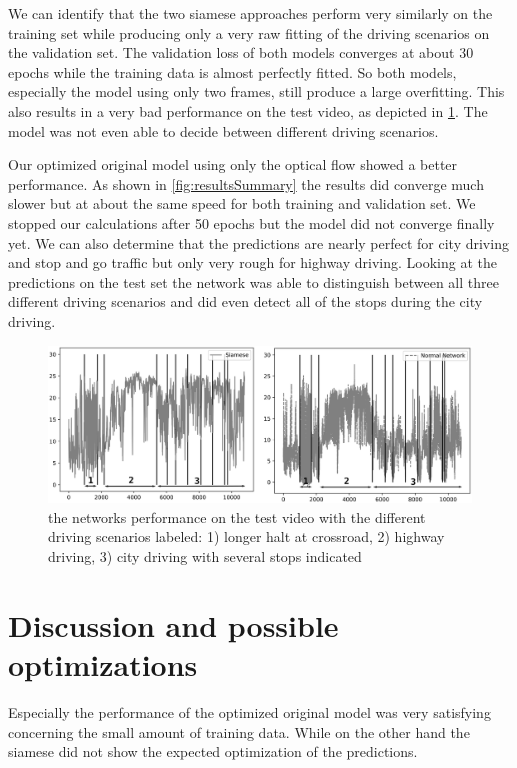 \documentclass[conference]{IEEEtran}
\begin{document}
We can identify that the two siamese approaches perform very similarly on the training set while producing only a very raw fitting of the driving scenarios on the validation set. The validation loss of both models converges at about 30 epochs while the training data is almost perfectly fitted. So both models, especially the model using only two frames, still produce a large overfitting. This also results in a very bad performance on the test video, as depicted in \cref{fig:resultsTestvideo}. The model was not even able to decide between different driving scenarios.

Our optimized original model using only the optical flow showed a better performance. As shown in \ref{fig:resultsSummary} the results did converge much slower but at about the same speed for both training and validation set. We stopped our calculations after 50 epochs but the model did not converge finally yet. We can also determine that the predictions are nearly perfect for city driving and stop and go traffic but only very rough for highway driving. Looking at the predictions on the test set the network was able to distinguish between all three different driving scenarios and did even detect all of the stops during the city driving.

\begin{figure}[ht]
	\centering
	\includegraphics[width=0.99\columnwidth]{imgs/both_testvideo.eps}
	\caption{the networks performance on the test video with the different driving scenarios labeled: 1) longer halt at crossroad, 2) highway driving, 3) city driving with several stops indicated}
	\label{fig:resultsTestvideo}
\end{figure}

\section{Discussion and possible optimizations}

Especially the performance of the optimized original model was very satisfying concerning the small amount of training data. While on the other hand the siamese did not show the expected optimization of the predictions.
\end{document}
